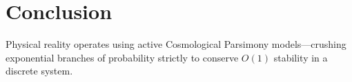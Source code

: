 \documentclass[12pt, a4paper]{article}
\theoremstyle{plain}
\theoremstyle{definition}
\begin{document}
\section{Conclusion}
Physical reality operates using active Cosmological Parsimony models—crushing exponential branches of probability strictly to conserve $O(1)$ stability in a discrete system.




\vspace{3em}
\noindent\hrulefill
\end{document}

